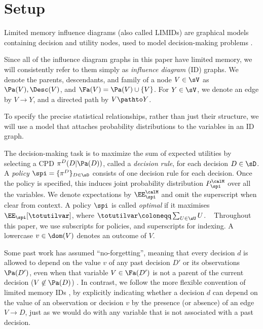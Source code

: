 \section{Setup}\label{sec:setup}






Limited memory influence diagrams (also called LIMIDs) are graphical models containing 
decision and utility nodes, used to model decision-making problems \citep{Howard1966,nilsson2000evaluating}.



Since all of the influence diagram graphs in this paper have limited memory, 
we will consistently refer to them simply as \emph{influence diagram} (ID) graphs.
We denote the parents, descendants, and family of a node $V \in \sV$
as $\Pa(V),\Desc(V)$, and $\Fa(V)=\Pa(V) \cup \{V\}$.
For $Y \in \sV$,  we denote an edge by $V \to Y$, 
and a directed path 
by $V \pathto Y$.






To specify the precise statistical relationships, rather than just their structure, 
we will use a model that attaches probability distributions to the variables 
in an ID graph.



The decision-making task is to maximize the sum of expected utilities by selecting a CPD $\pi^D(D | \Pa(D))$,
called a \emph{decision rule}, 
for each decision $D \in \sD$. 
A \emph{policy} $\spi=\{\pi^D\}_{D \in \sD}$ consists of one decision rule for each decision.
Once the policy is specified, 
this induces joint probability distribution $P^\calM_\spi$ over all the variables.
We denote expectations by $\EE^\calM_\spi$ and omit the superscript 
when clear from context.
A policy $\spi$ is called \emph{optimal} if it
maximises $\EE_{\spi}[\totutilvar]$, where
$\totutilvar \coloneqq \sum_{U \in \sU}{U}$.
~ %
Throughout this paper, we use subscripts for
policies, 
and superscripts for indexing.
A lowercase $v \in \dom(V)$ denotes an outcome of $V$.

Some past work has assumed ``no-forgetting'', meaning that every decision $d$ 
is allowed to depend on the value $v$ of any past decision $D'$ or 
its observations $\Pa(D')$, even when that variable $V \in \Fa(D')$ is not a parent of the current decision ($V \not \in \Pa(D)$) \citep{shachter1986evaluating}.
In contrast, we follow the more flexible convention of limited memory IDs \citep{nilsson2000evaluating}, 
by explicitly indicating whether a decision $d$ can depend on the value of an observation or decision $v$ 
by the presence (or absence) of an edge $V \to D$, just as we would do with any variable
that is not associated with a past decision.


